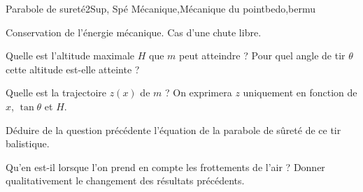 
\begin{exercise}{Parabole de sureté}{2}{Sup, Spé}
{Mécanique,Mécanique du point}{bedo,bermu}

\begin{questions}
\questioncours Conservation de l'énergie mécanique. Cas d'une chute libre.


\question Quelle est l'altitude maximale $H$ que $m$ peut atteindre ? Pour quel angle de tir $\theta$ cette altitude est-elle atteinte ?

\question Quelle est la trajectoire $z(x)$ de $m$ ? On exprimera $z$ uniquement en fonction de $x$, $\tan\theta$ et $H$.\\[-2em]

\question Déduire de la question précédente l'équation de la parabole de sûreté de ce tir balistique.

\question Qu’en est-il lorsque l’on prend en compte les frottements de l’air ? Donner qualitativement le changement des résultats précédents.
\end{questions}
\end{exercise}

